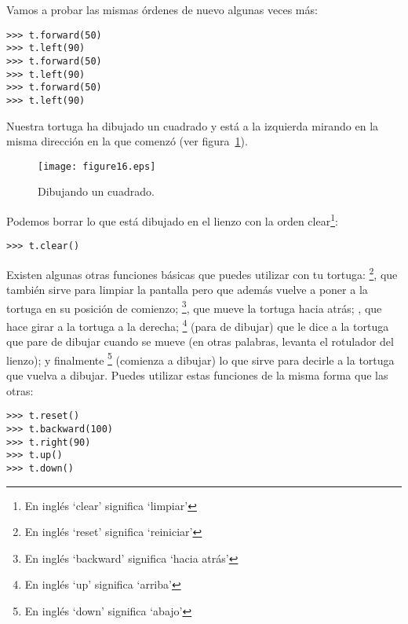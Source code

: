 Vamos a probar las mismas órdenes de nuevo algunas veces más:

\begin{listing}
\begin{verbatim}
>>> t.forward(50)
>>> t.left(90)
>>> t.forward(50)
>>> t.left(90)
>>> t.forward(50)
>>> t.left(90)
\end{verbatim}
\end{listing}

Nuestra tortuga ha dibujado un cuadrado y está a la izquierda mirando en la misma dirección en la que comenzó (ver figura~\ref{fig16}).

\begin{figure}
\begin{center}
\texttt{[image: figure16.eps]}
\end{center}
\caption{Dibujando un cuadrado.}\label{fig16}
\end{figure}

Podemos borrar lo que está dibujado en el lienzo con la orden clear\footnote{En inglés `clear' significa `limpiar'}:

\begin{listing}
\begin{verbatim}
>>> t.clear()
\end{verbatim}
\end{listing}

Existen algunas otras funciones básicas que puedes utilizar con tu tortuga: \footnote{En inglés `reset' significa `reiniciar'}, que también sirve para limpiar la pantalla pero que además vuelve a poner a la tortuga en su posición de comienzo; \footnote{En inglés `backward' significa `hacia atrás'}, que mueve la tortuga hacia atrás; , que hace girar a la tortuga a la derecha; \footnote{En inglés `up' significa `arriba'} (para de dibujar) que le dice a la tortuga que pare de dibujar cuando se mueve (en otras palabras, levanta el rotulador del lienzo); y finalmente \footnote{En inglés `down' significa `abajo'} (comienza a dibujar) lo que sirve para decirle a la tortuga que vuelva a dibujar. Puedes utilizar estas funciones de la misma forma que las otras:

\begin{listing}
\begin{verbatim}
>>> t.reset()
>>> t.backward(100)
>>> t.right(90)
>>> t.up()
>>> t.down()
\end{verbatim}
\end{listing}

